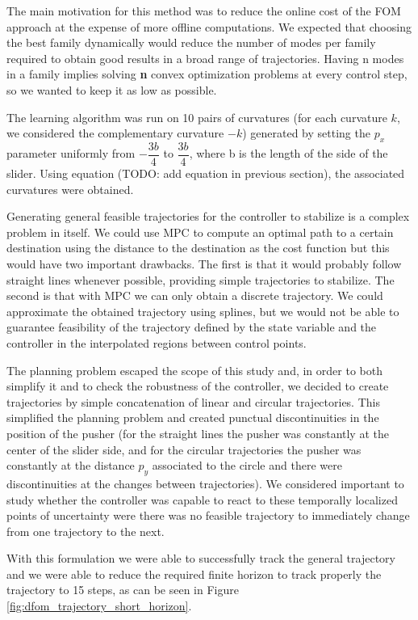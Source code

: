 \documentclass[12,twoside]{TFG-GM}
\theoremstyle{definition}
\theoremstyle{remark}
\begin{document}
The main motivation for this method was to reduce the online cost of the FOM approach at the expense of more offline computations. We expected that choosing the best family dynamically would reduce the number of modes per family required to obtain good results in a broad range of trajectories. Having n modes in a family implies solving \textbf{n} convex optimization problems at every control step, so we wanted to keep it as low as possible.

The learning algorithm was run on 10 pairs of curvatures (for each curvature $k$, we considered the complementary curvature $-k$) generated by setting the $p_x$ parameter uniformly from $-\dfrac{3b}{4}$ to  $\dfrac{3b}{4}$, where b is the length of the side of the slider. Using equation (TODO: add equation in previous section), the associated curvatures were obtained.

Generating general feasible trajectories for the controller to stabilize is a complex problem in itself. We could use MPC to compute an optimal path to a certain destination using the distance to the destination as the cost function but this would have two important drawbacks. The first is that it would probably follow straight lines whenever possible, providing simple trajectories to stabilize. The second is that with MPC we can only obtain a discrete trajectory. We could approximate the obtained trajectory using splines, but we would not be able to guarantee feasibility of the trajectory defined by the state variable and the controller in the interpolated regions between control points.

The planning problem escaped the scope of this study and, in order to both simplify it and to check the robustness of the controller, we decided to create trajectories by simple concatenation of linear and circular trajectories. This simplified the planning problem and created punctual discontinuities in the position of the pusher (for the straight lines the pusher was constantly at the center of the slider side, and for the circular trajectories the pusher was constantly at the distance $p_y$ associated to the circle and there were discontinuities at the changes between trajectories). We considered important to study whether the controller was capable to react to these temporally localized points of uncertainty were there was no feasible trajectory to immediately change from one trajectory to the next.

With this formulation we were able to successfully track the general trajectory and we were able to reduce the required finite horizon to track properly the trajectory to 15 steps, as can be seen in Figure \ref{fig:dfom_trajectory_short_horizon}.
\end{document}
